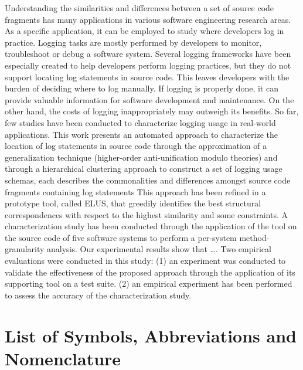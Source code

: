 \documentclass{ucalgthes1}
\theoremstyle{plain}
\theoremstyle{definition}
\begin{document}
Understanding the similarities and differences between a set of source code fragments has many applications in various software engineering research areas.  As a specific application, it can be employed to study where developers log in practice. Logging tasks are mostly performed by developers to monitor, troubleshoot or debug a software system. Several logging frameworks have been especially created to help developers perform logging practices, but they do not support locating log statements in source code. This leaves  developers with the burden of deciding where to log manually. If logging is properly done, it can provide valuable information for software development and maintenance. On the other hand, the costs of logging inappropriately may outweigh its benefits. So far, few studies have been conducted to characterize logging usage in real-world applications. This work presents an automated approach to characterize the location of log statements in source code through the approximation of a generalization technique (higher-order anti-unification modulo theories) and through a hierarchical clustering approach to construct a set of logging usage schemas, each describes the commonalities and differences amongst source code fragments containing log statements This approach has been refined in a prototype tool, called ELUS, that greedily identifies the best structural correspondences with respect to the highest similarity and some constraints. A characterization study has been conducted through the application of the tool on the source code of five software systems to perform a per-system method-granularity analysis. Our experimental results show that …. Two empirical evaluations were conducted in this study:  (1) an experiment was conducted to validate the effectiveness of the proposed approach through the application of its supporting tool on a test suite. (2) an  empirical experiment has been performed to assess the accuracy of the characterization study. 

\newpage
{}
{}


\begin{singlespace}
\newpage
{}
\tableofcontents
\pagestyle{plain}
\newpage
{}
\listoftables
\pagestyle{plain}
\newpage
{}
\listoffigures
\pagestyle{plain}
\clearpage
\clearpage          %
\end{singlespace}
\newpage
{}
\chapter*{\bf{List of Symbols, Abbreviations and Nomenclature}\hfill} 
\listofsymbols
\pagestyle{plain}
\clearpage
\end{document}
